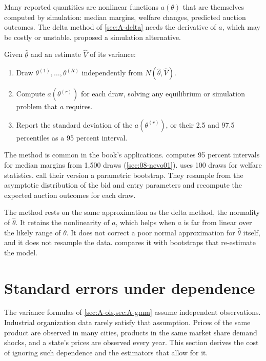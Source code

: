 Many reported quantities are nonlinear functions $a(\theta)$ that are themselves computed by simulation: median
margins, welfare changes, predicted auction outcomes. The delta method of \cref{sec:A-delta} needs the derivative of
$a$, which may be costly or unstable. \citet{KrinskyRobb1986} proposed a simulation alternative.

\begin{remark}\label{rem:A-krinsky-robb}
Given $\hat\theta$ and an estimate $\hat V$ of its variance:
\begin{enumerate}[label=(\arabic*)]
  \item Draw $\theta^{(1)}, \dots, \theta^{(R)}$ independently from $N(\hat\theta, \hat V)$.
  \item Compute $a(\theta^{(r)})$ for each draw, solving any equilibrium or simulation problem that $a$ requires.
  \item Report the standard deviation of the $a(\theta^{(r)})$, or their 2.5 and 97.5 percentiles as a 95 percent
  interval.
\end{enumerate}
\end{remark}

The method is common in the book's applications. \citet[Table~VIII, note]{Nevo2001} computes 95 percent intervals
for median margins from 1,500 draws (\cref{sec:08-nevo01}). \citet[p.~733]{Gentzkow2007} uses 100 draws for welfare
statistics. \citet[p.~248]{AtheyLevinSeira2011} call their version a parametric bootstrap. They resample from the
asymptotic distribution of the bid and entry parameters and recompute the expected auction outcomes for each draw.

The method rests on the same approximation as the delta method, the normality of $\hat\theta$. It retains the
nonlinearity of $a$, which helps when $a$ is far from linear over the likely range of $\theta$. It does not correct a
poor normal approximation for $\hat\theta$ itself, and it does not resample the data. 
compares it with bootstraps that re-estimate the model.

\section{Standard errors under dependence}\label{sec:A-se}

The variance formulas of \cref{sec:A-ols,sec:A-gmm} assume independent observations. Industrial organization data
rarely satisfy that assumption. Prices of the same product are observed in many cities, products in the same market
share demand shocks, and a state's prices are observed every year. This section derives the cost of ignoring such
dependence and the estimators that allow for it.

